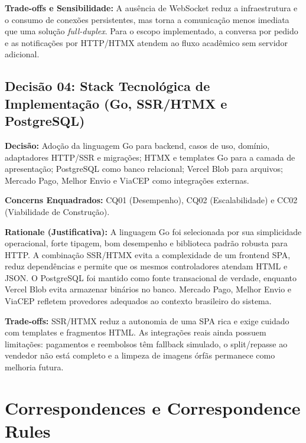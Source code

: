 \documentclass[12pt, a4paper]{article}
\begin{document}
\vspace{0.3cm}
\noindent\textbf{Trade-offs e Sensibilidade:} A ausência de WebSocket reduz a infraestrutura e o consumo de conexões persistentes, mas torna a comunicação menos imediata que uma solução \textit{full-duplex}. Para o escopo implementado, a conversa por pedido e as notificações por HTTP/HTMX atendem ao fluxo acadêmico sem servidor adicional.

\subsection{Decisão 04: Stack Tecnológica de Implementação (Go, SSR/HTMX e PostgreSQL)}

\noindent\textbf{Decisão:} Adoção da linguagem Go para backend, casos de uso, domínio, adaptadores HTTP/SSR e migrações; HTMX e templates Go para a camada de apresentação; PostgreSQL como banco relacional; Vercel Blob para arquivos; Mercado Pago, Melhor Envio e ViaCEP como integrações externas.

\vspace{0.3cm}
\noindent\textbf{Concerns Enquadrados:} CQ01 (Desempenho), CQ02 (Escalabilidade) e CC02 (Viabilidade de Construção).

\vspace{0.3cm}
\noindent\textbf{Rationale (Justificativa):} 
A linguagem Go foi selecionada por sua simplicidade operacional, forte tipagem, bom desempenho e biblioteca padrão robusta para HTTP. A combinação SSR/HTMX evita a complexidade de um frontend SPA, reduz dependências e permite que os mesmos controladores atendam HTML e JSON. O PostgreSQL foi mantido como fonte transacional de verdade, enquanto Vercel Blob evita armazenar binários no banco. Mercado Pago, Melhor Envio e ViaCEP refletem provedores adequados ao contexto brasileiro do sistema.

\vspace{0.3cm}
\noindent\textbf{Trade-offs:} SSR/HTMX reduz a autonomia de uma SPA rica e exige cuidado com templates e fragmentos HTML. As integrações reais ainda possuem limitações: pagamentos e reembolsos têm fallback simulado, o split/repasse ao vendedor não está completo e a limpeza de imagens órfãs permanece como melhoria futura.

\section{Correspondences e Correspondence Rules}
\end{document}
